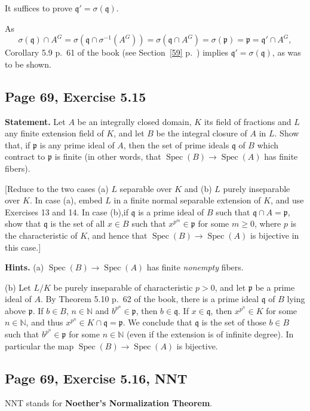 \documentclass[parskip=half,fontsize=12pt]{scrartcl}%
\newcommand{\mf}{\mathfrak}
\newcommand{\ppp}{\mf p}
\newcommand{\qqq}{\mf q}
\newcommand{\Spec}{\operatorname{Spec}}\newcommand{\Sp}{\operatorname{Spec}}
\begin{document}
It suffices to prove $\qqq'=\sigma(\qqq)$.

As 
$$
\sigma(\qqq)\cap A^G=\sigma\left(\qqq\cap\sigma^{-1}(A^G)\right)=\sigma\left(\qqq\cap A^G\right)=\sigma(\ppp)=\ppp=\qqq'\cap A^G,
$$ 
Corollary 5.9 p.~61 of the book (see Section~\ref{59} p.~\pageref{59}) implies $\qqq'=\sigma(\qqq)$, as was to be shown.

\subsection{Page 69, Exercise 5.15}%

\textbf{Statement.} Let $A$ be an integrally closed domain, $K$ its field of fractions and $L$ any finite extension field of $K$, and let $B$ be the integral closure of $A$ in $L$. Show that, if $\ppp$ is any prime ideal of $A$, then the set of prime ideals $\qqq$ of $B$ which contract to $\ppp$ is finite (in other words, that $\Spec(B)\to\Spec(A)$ has finite fibers).

[Reduce to the two cases (a) $L$ separable over $K$ and (b) $L$ purely inseparable over $K$. In case (a), embed $L$ in a finite normal separable extension of $K$, and use Exercises 13 and 14. In case (b),if $\qqq$ is a prime ideal of $B$ such that $\qqq\cap A =\ppp$, show that $\qqq$ is the set of all $x\in B$ such that $x^{p^m}\in\ppp$ for some $m\ge0$, where $p$ is the characteristic of $K$, and hence that $\Spec(B)\to\Spec(A)$ is bijective in this case.]

\textbf{Hints.} (a) $\Spec(B)\to\Spec(A)$ has finite \emph{nonempty} fibers.

(b) Let $L/K$ be purely inseparable of characteristic $p>0$, and let $\ppp$ be a prime ideal of $A$. By Theorem 5.10 p.~62 of the book, there is a prime ideal $\qqq$ of $B$ lying above $\ppp$. If $b\in B$, $n\in\mathbb N$ and $b^{p^n}\in\ppp$, then $b\in\qqq$. If $x\in\qqq$, then $x^{p^n}\in K$ for some $n\in\mathbb N$, and thus $x^{p^n}\in K\cap\qqq=\ppp$. We conclude that $\qqq$ is the set of those $b\in B$ such that $b^{p^n}\in\ppp$ for some $n\in\mathbb N$ (even if the extension is of infinite degree). In particular the map $\Spec(B)\to\Spec(A)$ is bijective.

\subsection{Page 69, Exercise 5.16, NNT}\label{nnt}%

NNT stands for \textbf{Noether's Normalization Theorem}.
\end{document}
